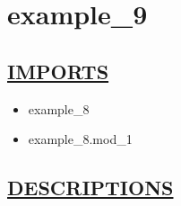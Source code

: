 \chapter*{example\_9}
\hypertarget{ecldoc:toc:example_9}{}

\section*{\underline{IMPORTS}}
\begin{itemize}
\item example\_8
\item example\_8.mod\_1
\end{itemize}

\section*{\underline{DESCRIPTIONS}}
